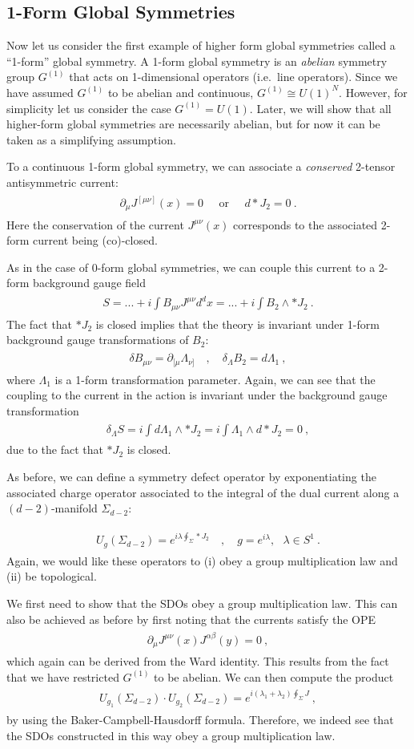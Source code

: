 \documentclass[11pt]{article}
\newcommand{\eq}[1]{\begin{align}\begin{split}#1\end{split}\end{align}}
\begin{document}
\subsection{1-Form Global Symmetries}

Now let us consider the first example of higher form global symmetries called a ``1-form'' global symmetry. A 1-form global symmetry is an \emph{abelian} symmetry group $G^{(1)}$ that acts on 1-dimensional operators (i.e.~line operators). Since we have assumed  $G^{(1)}$ to be abelian and continuous, $G^{(1)}\cong U(1)^N$. However, for simplicity let us consider the case $G^{(1)}=U(1)$. Later, we will show that all higher-form global symmetries are necessarily abelian, but for now it can be taken as a simplifying assumption.

To a continuous 1-form global symmetry, we can associate a \emph{conserved} 2-tensor antisymmetric current:
\eq{
\partial_\mu J^{[\mu \nu]}(x)=0 \;\;\;\;\; \text{or} \;\;\;\;\; d \ast  J_2 = 0~.
}
% 
Here the conservation of the current $J^{\mu\nu}(x)$ corresponds to the associated 2-form current being (co)-closed. 

As in the case of 0-form global symmetries, we can couple this current to a 2-form background gauge field
\eq{
S=...+i \int B_{\mu\nu}J^{\mu\nu} d^dx=...+i \int B_2\wedge 
\ast J_{2}~. 
}
The fact that $\ast J_{2}$ is closed implies that the theory is invariant under 1-form background gauge transformations of $B_2$:
\eq{
\delta B_{\mu\nu}=\partial_{[\mu}\Lambda_{\nu]}\quad,\quad 
\delta_\Lambda B_2=d\Lambda_1~,
}
where $\Lambda_1$ is a 1-form transformation parameter. Again, we can see that the coupling to the current in the action is invariant under the background gauge transformation 
\eq{
\delta_\Lambda S=i \int d\Lambda_1 \wedge \ast J_2=i\int \Lambda_1\wedge d \ast J_2=0~,
}
due to the fact that $\ast J_2$ is closed. 


As before, we can define a symmetry defect operator by exponentiating the associated charge operator associated to the integral of the dual current along a $(d-2)$-manifold $\Sigma_{d-2}$:

%
\eq{
U_g(\Sigma_{d-2})=e^{i \lambda \oint_\Sigma \ast J_2}\quad, \quad g=e^{i \lambda},~~~ \lambda \in S^1~.
}
Again, we would like these operators to (i) obey a group multiplication law and (ii) be topological. 

We first need to show  that the SDOs obey a group multiplication law. This can also be achieved as before by first noting that the currents satisfy the OPE 
\eq{
\partial_\mu J^{\mu\nu}(x)J^{\alpha\beta}(y)=0~,
}
which again can be derived from the Ward identity. 
This results from the fact that we have restricted $G^{(1)}$ to be abelian. We can then compute the product
\eq{
 U_{g_1}(\Sigma_{d-2}) \cdot U_{g_2}(\Sigma_{d-2})=e^{i (\lambda_1+\lambda_2)\oint_\Sigma J}~,
}
by using the Baker-Campbell-Hausdorff formula. Therefore, we indeed see that the SDOs constructed in this way obey a group multiplication law. 
\end{document}
